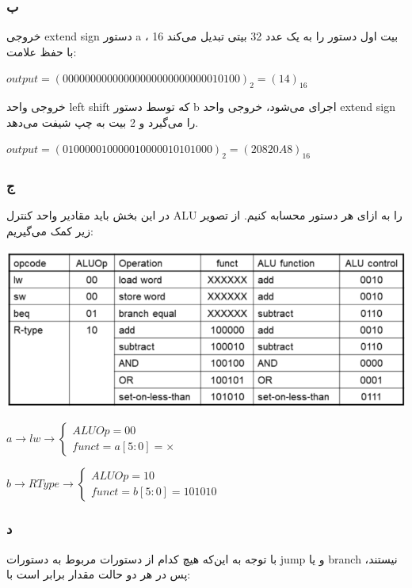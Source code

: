 \subsubsection*{ب}
خروجی extend sign دستور a ، 16 بیت اول دستور را به یک عدد 32 بیتی تبدیل می‌کند با حفظ علامت:
\setLTR

$output=(00000000000000000000000000010100)_2 = (14)_{16}$

\setRTL

خروجی واحد left shift که توسط دستور b اجرای می‌شود، خروجی واحد extend sign را می‌گیرد و 2 بیت به چپ شیفت می‌دهد.
\setLTR

$output = (010000010000010000010101000)_2 = (20820A8)_{16}$

\setRTL

\subsubsection*{ج}

در این بخش باید مقادیر واحد کنترل ALU را به ازای هر دستور محسابه کنیم. از تصویر زیر کمک می‌گیریم:

\setLTR
\qquad\qquad\qquad\qquad\qquad\includegraphics[scale=0.45]{figs/2.png}

$
a\rightarrow lw \rightarrow \begin{cases}
ALUOp = 00 \\
funct =  a[5:0] = \times
\end{cases}
$

$
b\rightarrow R Type \rightarrow \begin{cases}
	ALUOp = 10 \\
	funct = b[5:0] = 101010
\end{cases}
$

\setRTL

\subsubsection*{د}

با توجه به این‌که هیچ کدام از دستورات مربوط به دستورات jump و یا branch نیستند، پس در هر دو حالت مقدار برابر است با:

